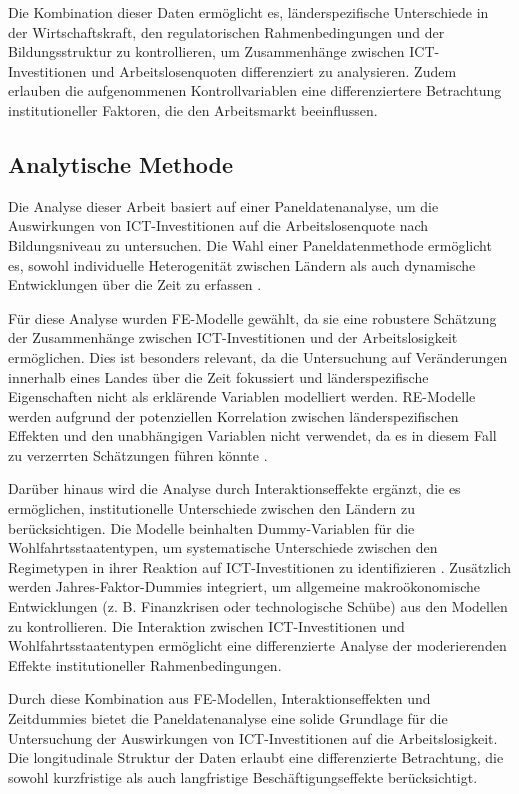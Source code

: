 Die Kombination dieser Daten ermöglicht es, länderspezifische Unterschiede in der Wirtschaftskraft, 
den regulatorischen Rahmenbedingungen und der Bildungsstruktur zu kontrollieren, um Zusammenhänge 
zwischen ICT-Investitionen und Arbeitslosenquoten differenziert zu analysieren. Zudem erlauben die 
aufgenommenen Kontrollvariablen eine differenziertere Betrachtung institutioneller Faktoren, die 
den Arbeitsmarkt beeinflussen.

\subsection{Analytische Methode}

Die Analyse dieser Arbeit basiert auf einer Paneldatenanalyse, um die Auswirkungen von
\ac{ICT}-Investitionen auf die Arbeitslosenquote nach Bildungsniveau zu untersuchen. Die Wahl
einer Paneldatenmethode ermöglicht es, sowohl individuelle Heterogenität zwischen Ländern als auch
dynamische Entwicklungen über die Zeit zu erfassen \parencite{wooldridge2010econometric}.

Für diese Analyse wurden \ac{FE}-Modelle gewählt, da sie eine robustere Schätzung der
Zusammenhänge zwischen \ac{ICT}-Investitionen und der Arbeitslosigkeit ermöglichen. Dies ist
besonders relevant, da die Untersuchung auf Veränderungen innerhalb eines Landes über die Zeit
fokussiert und länderspezifische Eigenschaften nicht als erklärende Variablen modelliert werden.
\ac{RE}-Modelle werden aufgrund der potenziellen Korrelation zwischen länderspezifischen Effekten
und den unabhängigen Variablen nicht verwendet, da es in diesem Fall zu verzerrten Schätzungen
führen könnte \parencite[S. 251–256]{wooldridge2010econometric}.

Darüber hinaus wird die Analyse durch Interaktionseffekte ergänzt, die es ermöglichen,
institutionelle Unterschiede zwischen den Ländern zu berücksichtigen. Die Modelle beinhalten
Dummy-Variablen für die Wohlfahrtsstaatentypen, um systematische Unterschiede zwischen den
Regimetypen in ihrer Reaktion auf \ac{ICT}-Investitionen zu identifizieren
\parencite{espingandersen1990thethree}. Zusätzlich werden Jahres-Faktor-Dummies integriert, um
allgemeine makroökonomische Entwicklungen (z. B. Finanzkrisen oder technologische Schübe) aus den
Modellen zu kontrollieren. Die Interaktion zwischen ICT-Investitionen und Wohlfahrtsstaatentypen
ermöglicht eine differenzierte Analyse der moderierenden Effekte institutioneller Rahmenbedingungen.

Durch diese Kombination aus \ac{FE}-Modellen, Interaktionseffekten und Zeitdummies bietet die
Paneldatenanalyse eine solide Grundlage für die Untersuchung der Auswirkungen von
\ac{ICT}-Investitionen auf die Arbeitslosigkeit. Die longitudinale Struktur der Daten erlaubt eine
differenzierte Betrachtung, die sowohl kurzfristige als auch langfristige Beschäftigungseffekte
berücksichtigt.